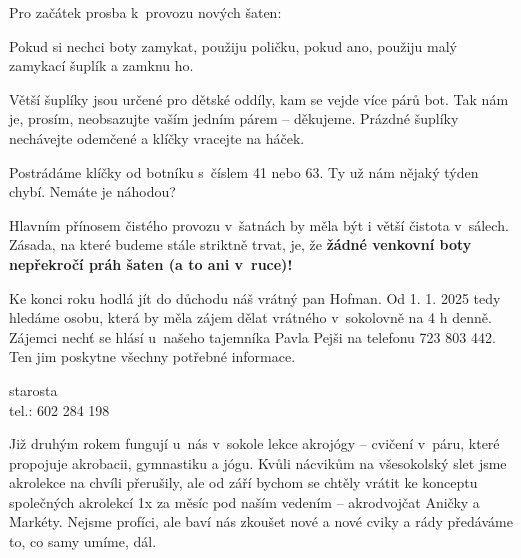 \documentclass[11pt]{article}
\begin{document}
Pro začátek prosba k~provozu nových šaten:

Pokud si nechci boty zamykat, použiju poličku, pokud ano, použiju malý zamykací šuplík a zamknu ho.

Větší šuplíky jsou určené pro dětské oddíly, kam se vejde více párů bot. Tak nám je, prosím, neobsazujte vaším jedním párem – děkujeme. Prázdné šuplíky nechávejte odemčené a klíčky vracejte na háček.

Postrádáme klíčky od botníku s~číslem 41 nebo 63. Ty už nám nějaký týden chybí. Nemáte je náhodou?

Hlavním přínosem čistého provozu v~šatnách by měla být i větší čistota v~sálech. Zásada, na které budeme stále striktně trvat, je, že \textbf{žádné venkovní boty nepřekročí práh šaten (a to ani v~ruce)!}

\clearpage

Ke konci roku hodlá jít do důchodu náš vrátný pan Hofman. Od 1. 1. 2025 tedy hledáme osobu, která by měla zájem dělat vrátného v~sokolovně na 4 h denně. Zájemci nechť se hlásí u~našeho tajemníka Pavla Pejši na telefonu 723 803 442. Ten jim poskytne všechny potřebné informace.

\signature{Jiří Novák (Jirkan)}{starosta\\tel.: 602 284 198}

Již druhým rokem fungují u~nás v~sokole lekce akrojógy –⁠⁠⁠⁠⁠⁠ cvičení v~páru, které propojuje akrobacii, gymnastiku a jógu. Kvůli nácvikům na všesokolský slet jsme akrolekce na chvíli přerušily, ale od září bychom se chtěly vrátit ke konceptu společných akrolekcí 1x za měsíc pod naším vedením –⁠⁠⁠⁠⁠⁠ akrodvojčat Aničky a Markéty. Nejsme profíci, ale baví nás zkoušet nové a nové cviky a rády předáváme to, co samy umíme, dál.
\end{document}
